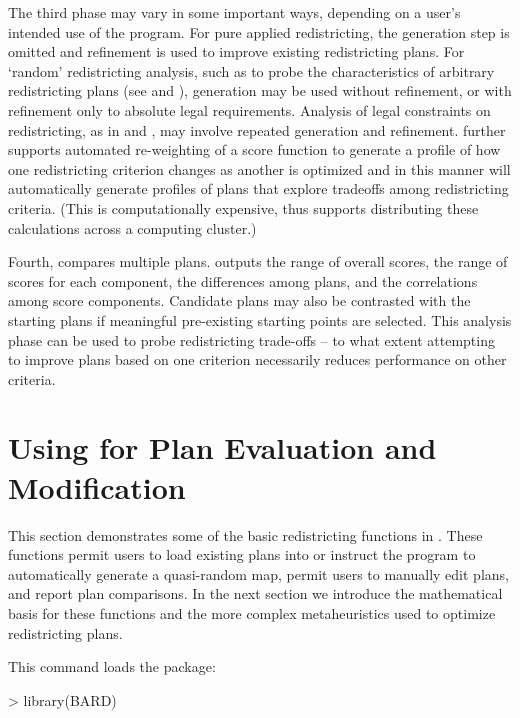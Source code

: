 \documentclass[article]{JSSstyle/jss}
\begin{document}
The third phase may vary in some important ways, depending on a user's intended use of the program. For pure applied redistricting, the generation step is omitted and refinement is used to improve existing redistricting plans. For `random' redistricting analysis, such as to probe the characteristics of arbitrary redistricting plans (see \citet{EngWild77,RosJohn81,Oloughlin82,Grofman82} and \citet{CirDarOro00}), generation may be used without refinement, or with refinement only to absolute legal requirements. Analysis of legal constraints on redistricting, as in \citet{Altman97} and \citet{RogersonYang99}, may involve repeated generation and refinement.  further supports automated re-weighting of a score function to generate a profile of how one redistricting criterion changes as another is optimized and in this manner  will automatically generate profiles of plans that explore tradeoffs among redistricting criteria. (This is computationally expensive, thus  supports distributing these calculations across a computing cluster.)

Fourth,  compares multiple plans.   outputs the range of overall scores, the range of scores for each component, the differences among plans, and the correlations among score components. Candidate plans may also be contrasted with the starting plans if meaningful pre-existing starting points are selected. This analysis phase can be used to probe redistricting trade-offs -- to what extent attempting to improve plans based on one criterion necessarily reduces performance on other criteria.

\section[Example: Using BARD for Plan Evaluation and Modification]{Using  for Plan Evaluation and Modification}

This section demonstrates some of the basic redistricting functions in . These functions permit users to load existing plans into  or instruct 
the program to automatically generate a quasi-random map, permit users to manually edit plans, 
and report plan comparisons. In the next section we introduce the mathematical basis for these functions 
and the more complex metaheuristics used to optimize redistricting plans.  

This command loads the  package:

\begin{Schunk}
\begin{Sinput}
> library(BARD)
\end{Sinput}
\end{Schunk}
\end{document}
